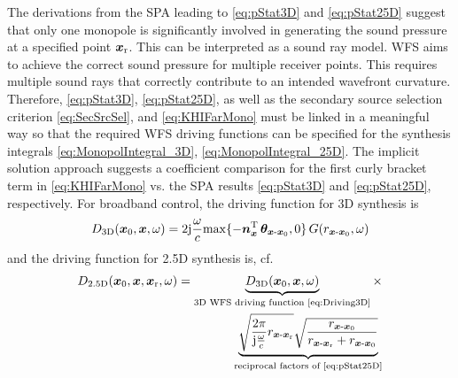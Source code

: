 The derivations from the SPA leading to
\myeqn\eqref{eq:pStat3D} and \eqref{eq:pStat25D}
suggest that only one monopole is significantly involved in generating the
sound pressure at a specified point $\bm{x}_\mathrm{r}$.
This can be interpreted as a sound ray model.
%
WFS aims to achieve the correct sound pressure for multiple receiver points.
This requires multiple sound rays that correctly contribute to an intended
wavefront curvature.
Therefore, \myeqn\eqref{eq:pStat3D}, \eqref{eq:pStat25D}, as well as
the secondary source selection criterion \eqref{eq:SecSrcSel},
and \eqref{eq:KHIFarMono} must be linked in a meaningful way so that
the required WFS driving functions can be specified for the synthesis integrals
\eqref{eq:MonopolIntegral_3D}, \eqref{eq:MonopolIntegral_25D}.
%
The implicit solution approach suggests a coefficient comparison for the
first curly bracket term in \myeq\eqref{eq:KHIFarMono} vs. the SPA results
\eqref{eq:pStat3D} and \eqref{eq:pStat25D}, respectively.
%
For broadband control, the driving function for 3D synthesis is
%
\begin{align}
D_\text{3D}(\xp,\xs,\omega) = 2\im\wc \mathrm{max}\{-\nxT \, \bm{\theta}_{\xs\text{-}\xp}, 0\} \, G(r_{\xs\text{-}\xp},\omega)
\label{eq:Driving3D}
\end{align}
%
and the driving function for 2.5D synthesis is,
cf. \cite{Deregowski1983,Bleistein1986}
%
\begin{align}
D_\text{2.5D}(\xp, \xs, \xr,\omega) = \underbrace{D_\text{3D}(\xp,\xs,\omega)}_{\text{3D WFS driving function \eqref{eq:Driving3D}}} \times\label{eq:Driving25D}\\
\underbrace{\sqrt{\frac{2\pi}{\im\wc} r_{\xs\text{-}\xr}}
\sqrt{\frac{r_{\xs\text{-}\xp}}{r_{\xs\text{-}\xr} + r_{\xs\text{-}\xp}}}}_{\text{reciprocal factors of \eqref{eq:pStat25D}}}\nonumber
\end{align}
